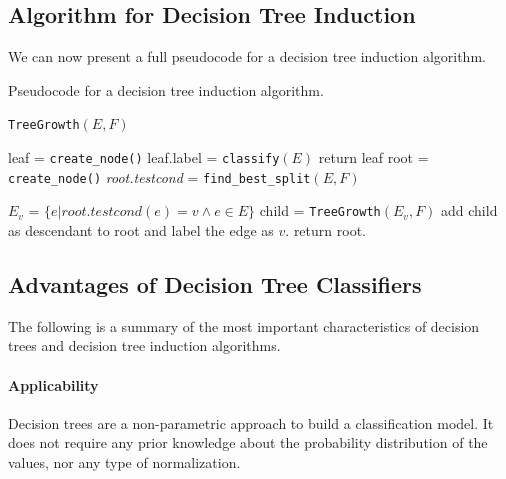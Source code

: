 
\subsection{Algorithm for Decision Tree Induction}

We can now present a full pseudocode for a decision tree induction algorithm.

\begin{algorithm}
\caption{Pseudocode for a decision tree induction algorithm.}
\texttt{TreeGrowth}$(E,F)$
\begin{algorithmic}[1]
            \State leaf = \texttt{create\_node()}
            \State leaf.label = \texttt{classify}$(E)$
            \State return leaf
        \Else
            \State root = \texttt{create\_node()}
            \State \textit{root.testcond} = \texttt{find\_best\_split}$(E,F)$

                \State $E_v$ = $\{e | \textit{root.testcond}(e) = v \land e \in E \}$
                \State child = \texttt{TreeGrowth}$(E_v,F)$
                \State add child as descendant to root and label the edge as $v$.
            \EndFor
        \EndIf
        \State return root.
\end{algorithmic}
\end{algorithm}

\subsection{Advantages of Decision Tree Classifiers}

The following is a summary of the most important characteristics of decision trees and decision tree induction algorithms.

\paragraph{Applicability}
Decision trees are a non-parametric approach to build a classification model. It does not require any prior knowledge about the probability distribution of the values, nor any type of normalization.

